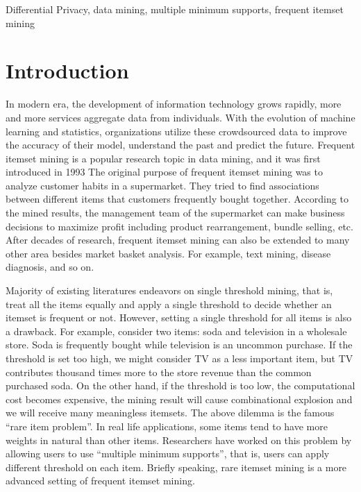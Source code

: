 \documentclass[conference]{IEEEtran}
\begin{document}
\begin{IEEEkeywords}
Differential Privacy, data mining, multiple minimum supports, frequent itemset mining
\end{IEEEkeywords}

\section{Introduction}%
In modern era, the development of information technology grows rapidly, more and more services aggregate data from individuals. 
With the evolution of machine learning and statistics, organizations utilize these crowdsourced data to improve the accuracy of their model, understand the past and predict the future.
Frequent itemset mining is a popular research topic in data mining, and it was first introduced in 1993 \cite{b1} 
The original purpose of frequent itemset mining was to analyze customer habits in a supermarket. 
They tried to find associations between different items that customers frequently bought together. 
According to the mined results, the management team of the supermarket can make business decisions to maximize profit including product rearrangement, bundle selling, etc.
After decades of research, frequent itemset mining can also be extended to many other area besides market basket analysis. For example, text mining, disease diagnosis, and so on.

Majority of existing literatures endeavors on single threshold mining, that is, treat all the items equally and apply a single threshold to decide whether an itemset is frequent or not.
However, setting a single threshold for all items is also a drawback. 
For example, consider two items: soda and television in a wholesale store. Soda is frequently bought while television is an uncommon purchase. 
If the threshold is set too high, we might consider TV as a less important item, but TV contributes thousand times more to the store revenue than the common purchased soda. 
On the other hand, if the threshold is too low, the computational cost becomes expensive, the mining result will cause combinational explosion and we will receive many meaningless itemsets. 
The above dilemma is the famous ``rare item problem''. In real life applications, some items tend to have more weights in natural than other items. 
Researchers \cite{b2}\cite{b3}\cite{b4}\cite{b5} have worked on this problem by allowing users to use ``multiple minimum supports'', that is, users can apply different threshold on each item.
Briefly speaking, rare itemset mining is a more advanced setting of frequent itemset mining. 
\end{document}
